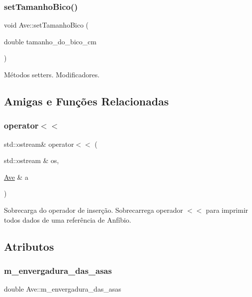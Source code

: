 \subsubsection{\texorpdfstring{set\+Tamanho\+Bico()}{setTamanhoBico()}}
{\footnotesize\ttfamily void Ave\+::set\+Tamanho\+Bico (\begin{DoxyParamCaption}\item[{double}]{tamanho\+\_\+do\+\_\+bico\+\_\+cm }\end{DoxyParamCaption})}

Métodos setters. Modificadores. 

\subsection{Amigas e Funções Relacionadas}
\mbox{\label{classAve_a47c80b591740b49f5f18073dbe9f1fe4}} 
\subsubsection{\texorpdfstring{operator$<$$<$}{operator<<}}
{\footnotesize\ttfamily std\+::ostream\& operator$<$$<$ (\begin{DoxyParamCaption}\item[{std\+::ostream \&}]{os,  }\item[{\hyperlink{classAve}{Ave} \&}]{a }\end{DoxyParamCaption})\hspace{0.3cm}{\ttfamily [friend]}}

Sobrecarga do operador de inserção. Sobrecarrega operador $<$$<$ para imprimir todos dados de uma referência de Anfíbio. 

\subsection{Atributos}
\mbox{\label{classAve_a6261373aae903e524e220e53ded18693}} 
\subsubsection{\texorpdfstring{m\+\_\+envergadura\+\_\+das\+\_\+asas}{m\_envergadura\_das\_asas}}
{\footnotesize\ttfamily double Ave\+::m\+\_\+envergadura\+\_\+das\+\_\+asas\hspace{0.3cm}{\ttfamily [protected]}}

